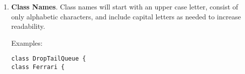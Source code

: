 \documentclass[11pt]{article}
\begin{document}
\begin{enumerate}
{\tt typedef double         Time\_t;         // Simulation time}\\
{\tt typedef unsigned long  SimulatorUid\_t; // Unique ID for each event}\\
{\tt typedef unsigned long  Event\_t;        // Idenifies events in handler}\\

\item {\bf Class Names}.  Class names will start with an upper case letter,
consist of only alphabetic characters, and include capital letters as 
needed to increase readability.

Examples:

{\tt class DropTailQueue \{}\\
{\tt class Ferrari \{}\\

\end{enumerate}

\end{document}
